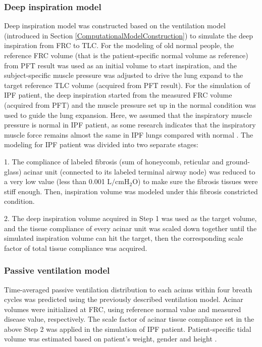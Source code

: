 \subsubsection{Deep inspiration model} 
Deep inspiration model was constructed based on the ventilation model (introduced in Section \ref{ComputationalModelConstruction}) to simulate the deep inspiration from FRC to TLC. For the modeling of old normal people, the reference FRC volume (that is the patient-specific normal volume as reference) from PFT result was used as an initial volume to start inspiration, and the subject-specific muscle pressure was adjusted to drive the lung expand to the target reference TLC volume (acquired from PFT result). For the simulation of IPF patient, the deep inspiration started from the measured FRC volume (acquired from PFT) and the muscle pressure set up in the normal condition was used to guide the lung expansion. Here, we assumed that the inspiratory muscle pressure is normal in IPF patient, as some research indicates that the inspiratory muscle force remains almost the same in IPF lungs compared with normal \citep{de1980inspiratory}. The modeling for IPF patient was divided into two separate stages:

1. The compliance of labeled fibrosis (sum of honeycomb, reticular and ground-glass) acinar unit (connected to its labeled terminal airway node) was reduced to a very low value (less than 0.001 $\mathrm{L/cmH_2O}$) to make sure the fibrosis tissues were stiff enough. Then, inspiration volume was modeled under this fibrosis constricted condition.

2. The deep inspiration volume acquired in Step 1 was used as the target volume, and the tissue compliance of every acinar unit was scaled down together until the simulated inspiration volume can hit the target, then the corresponding scale factor of total tissue compliance was acquired.

\subsubsection{Passive ventilation model}
Time-averaged passive ventilation distribution to each acinus within four breath cycles was predicted using the previously described ventilation model. Acinar volumes were initialized at FRC, using reference normal value and measured disease value, respectively. The scale factor of acinar tissue compliance set in the above Step 2 was applied in the simulation of IPF patient. Patient-specific tidal volume was estimated based on patient's weight, gender and height \citep{gilbert1972changes, pelosi1998effects}.

